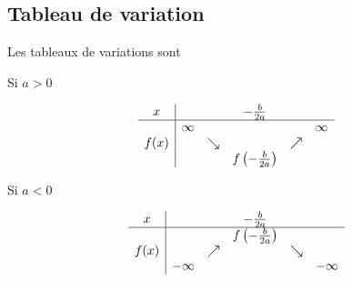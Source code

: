 \subsection{Tableau de variation}

Les tableaux de variations sont
\begin{multicols}{2}

    \begin{center}
        Si \( a>0\)

        \begin{equation*}
            \begin{array}[]{c|ccccc}
                x&&&-\frac{ b }{ 2a }&&\\
                \hline
                &\infty&&&&\infty\\
                f(x)&&\searrow&&\nearrow&\\
                &&&f\left( -\frac{ b }{ 2a } \right)&&\\
            \end{array}
        \end{equation*}
        
    \end{center}

    \columnbreak

    \begin{center}
        Si \( a<0\)


        \begin{equation*}
            \begin{array}[]{c|ccccc}
                x&&&-\frac{ b }{ 2a }&&\\
                \hline
                &&&f\left( -\frac{ b }{ 2a } \right)&&\\
                f(x)&&\nearrow&&\searrow&\\
                &-\infty&&&&-\infty\\
            \end{array}
        \end{equation*}
    \end{center}
\end{multicols}

